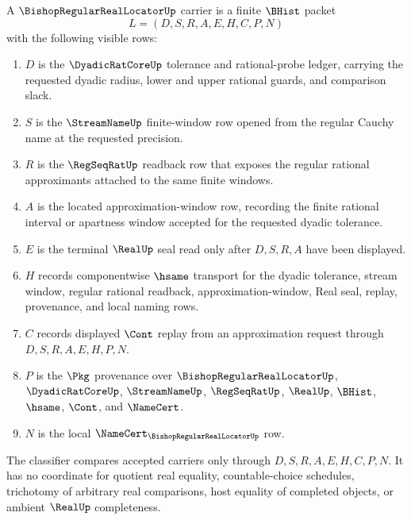 \begin{definition}
\label{def:bishop-regular-real-locator-carrier}
A $\BishopRegularRealLocatorUp$ carrier is a finite $\BHist$ packet
$$
L=(D,S,R,A,E,H,C,P,N)
$$
with the following visible rows:
\begin{enumerate}
\item $D$ is the $\DyadicRatCoreUp$ tolerance and rational-probe ledger, carrying the requested dyadic radius, lower and upper rational guards, and comparison slack.
\item $S$ is the $\StreamNameUp$ finite-window row opened from the regular Cauchy name at the requested precision.
\item $R$ is the $\RegSeqRatUp$ readback row that exposes the regular rational approximants attached to the same finite windows.
\item $A$ is the located approximation-window row, recording the finite rational interval or apartness window accepted for the requested dyadic tolerance.
\item $E$ is the terminal $\RealUp$ seal read only after $D,S,R,A$ have been displayed.
\item $H$ records componentwise $\hsame$ transport for the dyadic tolerance, stream window, regular rational readback, approximation-window, Real seal, replay, provenance, and local naming rows.
\item $C$ records displayed $\Cont$ replay from an approximation request through $D,S,R,A,E,H,P,N$.
\item $P$ is the $\Pkg$ provenance over $\BishopRegularRealLocatorUp$, $\DyadicRatCoreUp$, $\StreamNameUp$, $\RegSeqRatUp$, $\RealUp$, $\BHist$, $\hsame$, $\Cont$, and $\NameCert$.
\item $N$ is the local $\NameCert_{\BishopRegularRealLocatorUp}$ row.
\end{enumerate}
The classifier compares accepted carriers only through $D,S,R,A,E,H,C,P,N$. It has no coordinate for quotient real equality, countable-choice schedules, trichotomy of arbitrary real comparisons, host equality of completed objects, or ambient $\RealUp$ completeness.
\end{definition}

